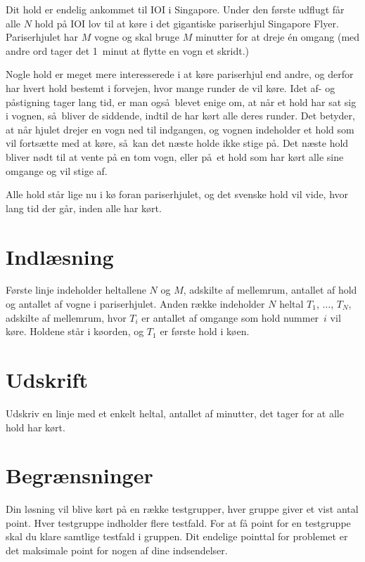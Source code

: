 

Dit hold er endelig ankommet til IOI i Singapore.
Under den første udflugt får alle $N$ hold på IOI lov til at køre i det gigantiske pariserhjul Singapore Flyer.
Pariserhjulet har $M$ vogne og skal bruge $M$ minutter for at dreje én omgang (med andre ord tager det 1~minut at flytte en vogn et skridt.)

Nogle hold er meget mere interesserede i at køre pariserhjul end andre, og derfor har hvert hold bestemt i forvejen, hvor mange runder de vil køre.
Idet af- og påstigning tager lang tid, er man også blevet enige om, at når et hold har sat sig i vognen, så bliver de siddende, indtil de har kørt alle deres runder.
Det betyder, at når hjulet drejer en vogn ned til indgangen, og vognen indeholder et hold som vil fortsætte med at køre, så kan det næste holde ikke stige på.
Det næste hold bliver nødt til at vente på en tom vogn, eller på et hold som har kørt alle sine omgange og vil stige af.


Alle hold står lige nu i kø foran pariserhjulet, og det svenske hold vil vide, hvor lang tid der går, inden alle har kørt.

\section*{Indlæsning}
Første linje indeholder heltallene $N$ og $M$, adskilte af mellemrum, antallet af hold og antallet af vogne i pariserhjulet.
Anden række indeholder $N$ heltal $T_1$, $\ldots$, $T_N$, adskilte af mellemrum, hvor $T_i$ er antallet af omgange som hold  nummer~$i$ vil køre.
Holdene står i køorden, og $T_1$ er første hold i køen.

\section*{Udskrift}
Udskriv en linje med et enkelt heltal, antallet af minutter, det tager for at alle hold har kørt.

\section*{Begrænsninger}
Din løsning vil blive kørt på en række testgrupper, hver gruppe giver et vist antal point.
Hver testgruppe indholder flere testfald.
For at få point for en testgruppe skal du klare samtlige testfald i gruppen.
Dit endelige pointtal for problemet er det maksimale point for nogen af dine indsendelser.

